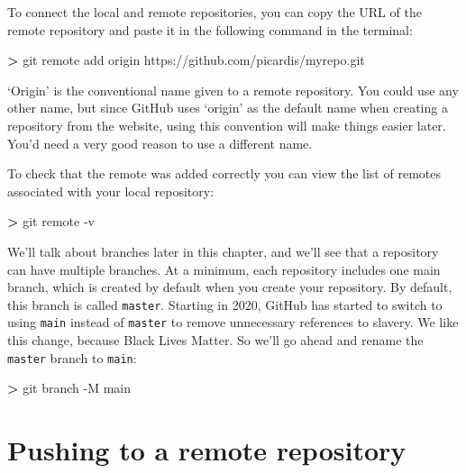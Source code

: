 \documentclass[
]{book}
\newenvironment{Shaded}{\begin{snugshade}}{\end{snugshade}}
\newcommand{\AttributeTok}[1]{\textcolor[rgb]{0.13,0.29,0.53}{#1}}
\newcommand{\ExtensionTok}[1]{#1}
\newcommand{\NormalTok}[1]{#1}
\newcommand{\OperatorTok}[1]{\textcolor[rgb]{0.81,0.36,0.00}{\textbf{#1}}}
\begin{document}
To connect the local and remote repositories, you can copy the URL of the remote repository and paste it in the following command in the terminal:

\begin{Shaded}
\begin{Highlighting}[]
\OperatorTok{\textgreater{}}\NormalTok{ git }\ExtensionTok{remote}\NormalTok{ add origin https://github.com/picardis/myrepo.git}
\end{Highlighting}
\end{Shaded}

`Origin' is the conventional name given to a remote repository. You could use any other name, but since GitHub uses `origin' as the default name when creating a repository from the website, using this convention will make things easier later. You'd need a very good reason to use a different name.

To check that the remote was added correctly you can view the list of remotes associated with your local repository:

\begin{Shaded}
\begin{Highlighting}[]
\OperatorTok{\textgreater{}}\NormalTok{ git }\ExtensionTok{remote} \AttributeTok{{-}v}
\end{Highlighting}
\end{Shaded}

We'll talk about branches later in this chapter, and we'll see that a repository can have multiple branches. At a minimum, each repository includes one main branch, which is created by default when you create your repository. By default, this branch is called \texttt{master}. Starting in 2020, GitHub has started to switch to using \texttt{main} instead of \texttt{master} to remove unnecessary references to slavery. We like this change,
because Black Lives Matter. So we'll go ahead and rename the \texttt{master} branch to \texttt{main}:

\begin{Shaded}
\begin{Highlighting}[]
\OperatorTok{\textgreater{}}\NormalTok{ git }\ExtensionTok{branch} \AttributeTok{{-}M}\NormalTok{ main}
\end{Highlighting}
\end{Shaded}

\hypertarget{pushing-to-a-remote-repository}{%
\section{Pushing to a remote repository}\label{pushing-to-a-remote-repository}}
\end{document}
